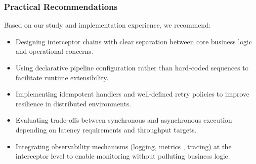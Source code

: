 \subsubsection{Practical Recommendations} 
Based on our study and implementation experience, we recommend:
\begin{itemize}
    \item Designing interceptor chains with clear separation between core business logic and operational concerns. 
    \item Using declarative pipeline configuration rather than hard-coded sequences to facilitate runtime extensibility.
    \item Implementing idempotent handlers and well-defined retry policies to improve resilience in distributed environments. 
    \item Evaluating trade-offs between synchronous and asynchronous execution depending on latency requirements and throughput targets.
    \item Integrating observability mechanisms  (logging, metrics , tracing) at the interceptor level to enable monitoring without polluting business logic. 
\end{itemize}
